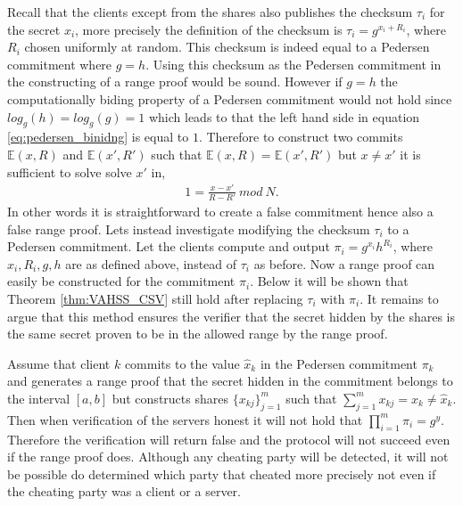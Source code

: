 Recall that the clients except from the shares also publishes the checksum $\tau_i$ for the secret $x_i$, more precisely the definition of the checksum is  $\tau_i=g^{x_i+R_i}$, where $R_i$ chosen uniformly at random. This checksum is indeed equal to a Pedersen commitment where $g=h$. Using this checksum as the Pedersen commitment in the constructing of a range proof would be sound. However if $g=h$ the computationally biding property of a Pedersen commitment would not hold since $log_g(h)=log_g(g)=1$ which leads to that the left hand side in equation \eqref{eq:pedersen_binidng} is equal to $1$. Therefore to construct two commits $\mathds{E}(x,R)$ and $\mathds{E}(x',R')$ such that $\mathds{E}(x,R) = \mathds{E}(x',R')$ but $x\neq x'$ it is sufficient to solve solve $x'$ in, 
\begin{align*}
1 = \frac{x-x'}{R-R'}\:mod \:N.
\end{align*}
In other words it is straightforward to create a false commitment hence also a false range proof. Lets instead investigate modifying the checksum $\tau_i$ to a Pedersen commitment. Let the clients compute and output $\pi_i=g^{x_i}h^{R_i}$, where $x_i,R_i,g,h$ are as defined above, instead of $\tau_i$ as before.  Now a range proof can easily be constructed for the commitment $\pi_i$. Below it will be shown that Theorem \ref{thm:VAHSS_CSV} still hold after replacing $\tau_i$ with $\pi_i$. It remains to argue that this method ensures the verifier that the secret hidden by the shares is the same secret proven to be in the allowed range by the range proof. 

Assume that client $k$ commits to the value $\hat{x}_k$ in the Pedersen commitment $\pi_k$ and generates a range proof that the secret hidden in the commitment belongs to the interval $[a,b]$ but constructs shares $\{x_{kj}\}_{j=1}^m$ such that $\sum_{j=1}^m x_{kj} = x_k \neq \hat{x}_k$. Then when verification of the servers honest it will not hold that $\prod_{i=1}^m \pi_i = g^y$. Therefore the verification will return false and the protocol will not succeed even if the range proof does. Although any cheating party will be detected, it will not be possible do determined which party that cheated more precisely not even if the cheating party was a client or a server. 

